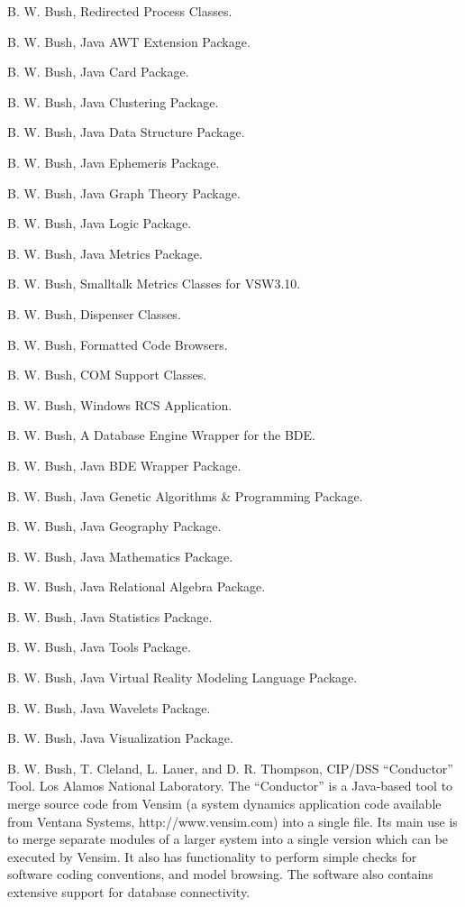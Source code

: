 \documentclass[]{article}
\begin{document}
B. W. Bush, Redirected Process Classes.

B. W. Bush, Java AWT Extension Package.

B. W. Bush, Java Card Package.

B. W. Bush, Java Clustering Package.

B. W. Bush, Java Data Structure Package.

B. W. Bush, Java Ephemeris Package.

B. W. Bush, Java Graph Theory Package.

B. W. Bush, Java Logic Package.

B. W. Bush, Java Metrics Package.

B. W. Bush, Smalltalk Metrics Classes for VSW3.10.

B. W. Bush, Dispenser Classes.

B. W. Bush, Formatted Code Browsers.

B. W. Bush, COM Support Classes.

B. W. Bush, Windows RCS Application.

B. W. Bush, A Database Engine Wrapper for the BDE.

B. W. Bush, Java BDE Wrapper Package.

B. W. Bush, Java Genetic Algorithms \& Programming Package.

B. W. Bush, Java Geography Package.

B. W. Bush, Java Mathematics Package.

B. W. Bush, Java Relational Algebra Package.

B. W. Bush, Java Statistics Package.

B. W. Bush, Java Tools Package.

B. W. Bush, Java Virtual Reality Modeling Language Package.

B. W. Bush, Java Wavelets Package.

B. W. Bush, Java Visualization Package.

B. W. Bush, T. Cleland, L. Lauer, and D. R. Thompson, CIP/DSS
``Conductor'' Tool. Los Alamos National Laboratory. The ``Conductor'' is
a Java-based tool to merge source code from Vensim (a system dynamics
application code available from Ventana Systems, http://www.vensim.com)
into a single file. Its main use is to merge separate modules of a
larger system into a single version which can be executed by Vensim. It
also has functionality to perform simple checks for software coding
conventions, and model browsing. The software also contains extensive
support for database connectivity.
\end{document}
